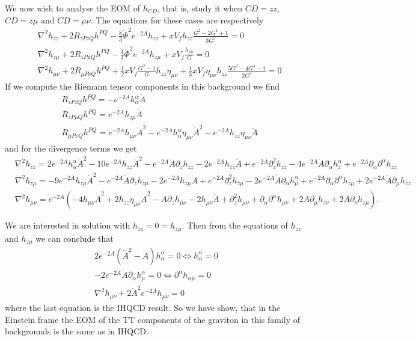 \documentclass[a4paper,12pt]{article}
\begin{document}
We now wish to analyse the EOM of $h_{CD}$, that is, study it when $CD = zz$, $CD = z\mu$ and $CD = \mu \nu$. The equations for these cases are respectively
\begin{align}
&\nabla^2 h_{zz} + 2 R_{zPzQ} h^{PQ} - \frac{8}{3} {\dot{\Phi}}^2 e^{-2A} h_{zz} + x V_f h_{zz} \frac{G^2 - 2 G^4 +1}{3 G^3} = 0 \\
& \nabla^2 h_{z\mu} + 2 R_{zP\mu Q} h^{PQ} - \frac{4}{3} {\dot{\Phi}}^2 e^{-2A} h_{z \mu} + x V_f \frac{h_{z\mu}}{G} = 0 \\
& \nabla^2 h_{\mu \nu} + 2 R_{\mu P \nu Q} h^{PQ} + \frac{1}{2} x V_f \frac{G^2 - 1}{G} h_{zz} \eta_{\mu \nu} + \frac{1}{3} x V_f \eta_{\mu \nu} h_{zz} \frac{5 G^2 - 4 G^4 -1}{2 G^3} = 0
\end{align}
If we compute the Riemann tensor components in this background we find
\begin{align}
&R_{zPzQ} h^{PQ} = - e^{-2A} h_{\alpha}^\alpha \ddot{A} \\
&R_{zP\mu Q} h^{PQ} = e^{-2A} h_{z \mu} \ddot{A} \\
& R_{\mu P \nu Q} h^{PQ} = e^{-2A} h_{\mu \nu} {\dot{A}}^2 - e^{-2A} h_{\alpha}^\alpha \eta_{\mu \nu} {\dot{A}}^2 - e^{-2A} h_{zz} \eta_{\mu \nu} \ddot{A}
\end{align}
and for the divergence terms we get
\begin{align}
& \nabla^2 h_{zz} = 2 e^{-2A} h_{\alpha}^\alpha {\dot{A}}^2 - 10 e^{-2A} h_{zz}  {\dot{A}}^2  - e^{-2A} \dot{A} \partial_z h_{zz} - 2 e^{-2A} h_{zz} \ddot{A} + e^{-2A} \partial_z^2{h_{zz}} - 4 e^{-2A} \dot{A} \partial_\alpha h_{z}^\alpha + e^{-2A} \partial_\alpha \partial^\alpha h_{zz} \\
& \nabla^2 h_{z \mu} = - 9 e^{-2A} h_{z\mu} {\dot{A}}^2 - e^{-2A} \dot{A} \partial_z h_{z \mu} - 2 e^{-2A} h_{z \mu} \ddot{A} + e^{-2A} \partial_z^2 h_{z\mu} - 2 e^{-2A} \dot{A} \partial_\alpha h_{\mu}^\alpha + e^{-2A} \partial_\alpha \partial^\alpha h_{z\mu} + 2 e^{-2A} \dot{A} \partial_\mu h_{zz} \\
& \nabla^2 h_{\mu \nu} = e^{-2A} \left( -4 h_{\mu\nu} {\dot{A}}^2 + 2 h_{zz} \eta_{\mu\nu} {\dot{A}}^2 - \dot{A} \partial_z h_{\mu \nu} -2 h_{\mu \nu} \ddot{A} + \partial_z^2 h_{\mu \nu} + \partial_\alpha \partial^\alpha h_{\mu \nu} + 2 \dot{A} \partial_\mu h_{z \nu} + 2 \dot{A} \partial_\nu h_{z \mu}\right).
\end{align}

We are interested in solution with $h_{zz} = 0 = h_{z\mu}$. Then from the equations of $h_{zz}$ and $h_{z\mu}$ we can conclude that
\begin{align}
2 e^{-2A}  \left({\dot{A}}^2 - \ddot{A}\right) h_{\alpha}^\alpha = 0 \Leftrightarrow h_{\alpha}^\alpha = 0 \\
-2 e^{-2 A} \dot{A} \partial_\alpha h^{\alpha}_\mu = 0 \Leftrightarrow \partial^\alpha h_{\alpha \mu} = 0 \\
\nabla^2 h_{\mu \nu} + 2 {\dot{A}}^2 e^{-2A} h_{\mu \nu} = 0
\end{align}
where the last equation is the IHQCD result. So we have show, that in the Einstein frame the EOM of the TT components of the graviton in this family of backgrounds is the same as in IHQCD.
\end{document}
